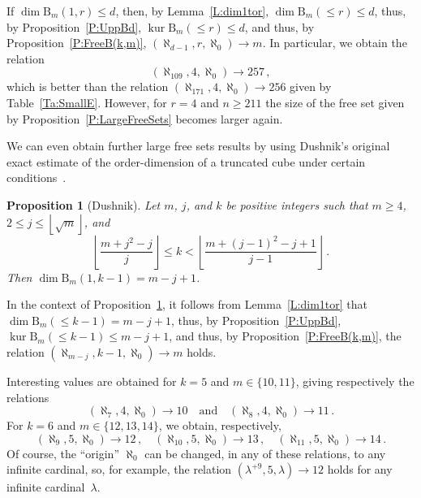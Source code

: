 \documentclass[psamsfonts,reqno]{amsart}
\theoremstyle{plain}
\newtheorem{proposition}[lemma]{Proposition}
\theoremstyle{definition}
\theoremstyle{remark}
\numberwithin{equation}{section}
\numberwithin{figure}{section}
\newcommand{\gl}{\lambda}
\newcommand{\les}{\leqslant}
\newcommand{\intgr}[1]{\left\lfloor{#1}\right\rfloor}
\DeclareMathOperator{\kur}{kur}
\newcommand{\set}[1]{\{#1\}}
\newcommand{\rB}{\mathrm{B}}
\begin{document}
If $\dim\rB_m(1,r)\leq d$, then, by Lemma~\ref{L:dim1tor}, $\dim\rB_m({\les}r)\leq d$, thus, by Proposition~\ref{P:UppBd}, $\kur\rB_m({\les}r)\leq d$, and thus, by Proposition~\ref{P:FreeB(k,m)}, $(\aleph_{d-1},r,\aleph_0)\rightarrow m$. In particular, we obtain the relation
 \[
 (\aleph_{109},4,\aleph_0)\rightarrow 257\,,
 \]
which is better than the relation $(\aleph_{171},4,\aleph_0)\rightarrow 256$ given by Table~\ref{Ta:SmallE}. However, for $r=4$ and $n\geq211$ the size of the free set given by Proposition~\ref{P:LargeFreeSets} becomes larger again.

We can even obtain further large free sets results by using Dushnik's original exact estimate of the order-dimension of a truncated cube under certain conditions~\cite{Dush50}.

\begin{proposition}[Dushnik]\label{P:Dush50}
Let $m$, $j$, and $k$ be positive integers such that $m\geq4$, $2\leq j\leq\intgr{\sqrt{m}}$, and
 \[
 \intgr{\frac{m+j^2-j}{j}}\leq k<\intgr{\frac{m+(j-1)^2-j+1}{j-1}}\,.
 \]
Then $\dim\rB_m(1,k-1)=m-j+1$.
\end{proposition}

In the context of Proposition~\ref{P:Dush50}, it follows from Lemma~\ref{L:dim1tor} that\linebreak $\dim\rB_m({\les}k-1)=m-j+1$, thus, by Proposition~\ref{P:UppBd}, $\kur\rB_m({\les}k-1)\leq m-j+1$, and thus, by Proposition~\ref{P:FreeB(k,m)}, the relation $(\aleph_{m-j},k-1,\aleph_0)\rightarrow m$ holds.

Interesting values are obtained for $k=5$ and $m\in\set{10,11}$, giving respectively the relations
 \[
 (\aleph_7,4,\aleph_0)\rightarrow 10\quad\text{and}\quad
 (\aleph_8,4,\aleph_0)\rightarrow 11\,.
 \]
For $k=6$ and $m\in\set{12,13,14}$, we obtain, respectively,
 \[
 (\aleph_9,5,\aleph_0)\rightarrow 12\,,\quad
 (\aleph_{10},5,\aleph_0)\rightarrow 13\,,\quad
 (\aleph_{11},5,\aleph_0)\rightarrow 14\,.
 \]
Of course, the ``origin'' $\aleph_0$ can be changed, in any of these relations, to any infinite cardinal, so, for example, the relation $(\gl^{+9},5,\gl)\rightarrow 12$ holds for any infinite cardinal~$\gl$.
\end{document}
